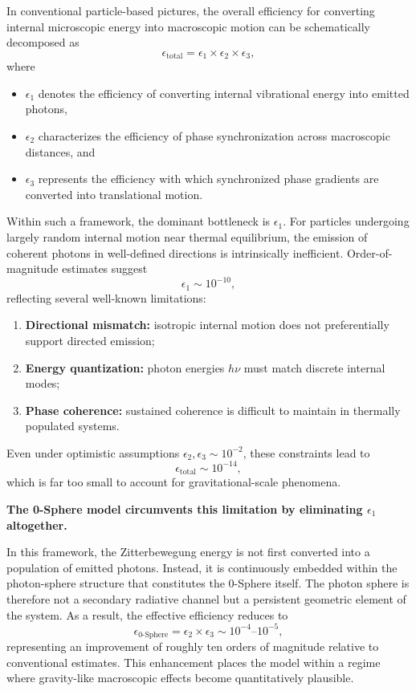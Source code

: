 \documentclass[12pt,letterpaper]{article}
\begin{document}
In conventional particle-based pictures, the overall efficiency for converting internal microscopic energy into macroscopic motion can be schematically decomposed as
\begin{equation}
\epsilon_\text{total} = \epsilon_1 \times \epsilon_2 \times \epsilon_3 ,
\end{equation}
where
\begin{itemize}
\item $\epsilon_1$ denotes the efficiency of converting internal vibrational energy into emitted photons,
\item $\epsilon_2$ characterizes the efficiency of phase synchronization across macroscopic distances, and
\item $\epsilon_3$ represents the efficiency with which synchronized phase gradients are converted into translational motion.
\end{itemize}

Within such a framework, the dominant bottleneck is $\epsilon_1$. For particles undergoing largely random internal motion near thermal equilibrium, the emission of coherent photons in well-defined directions is intrinsically inefficient. Order-of-magnitude estimates suggest
\[
\epsilon_1 \sim 10^{-10},
\]
reflecting several well-known limitations:
\begin{enumerate}
\item \textbf{Directional mismatch:} isotropic internal motion does not preferentially support directed emission;
\item \textbf{Energy quantization:} photon energies $h\nu$ must match discrete internal modes;
\item \textbf{Phase coherence:} sustained coherence is difficult to maintain in thermally populated systems.
\end{enumerate}

Even under optimistic assumptions $\epsilon_2, \epsilon_3 \sim 10^{-2}$, these constraints lead to
\[
\epsilon_\text{total} \sim 10^{-14},
\]
which is far too small to account for gravitational-scale phenomena.

\medskip
\noindent
\textbf{The 0-Sphere model circumvents this limitation by eliminating $\epsilon_1$ altogether.}

In this framework, the Zitterbewegung energy is not first converted into a population of emitted photons. Instead, it is continuously embedded within the photon-sphere structure that constitutes the 0-Sphere itself. The photon sphere is therefore not a secondary radiative channel but a persistent geometric element of the system. As a result, the effective efficiency reduces to
\begin{equation}
\epsilon_\text{0-Sphere} = \epsilon_2 \times \epsilon_3 \sim 10^{-4}\text{--}10^{-5},
\end{equation}
representing an improvement of roughly ten orders of magnitude relative to conventional estimates. This enhancement places the model within a regime where gravity-like macroscopic effects become quantitatively plausible.
\end{document}
